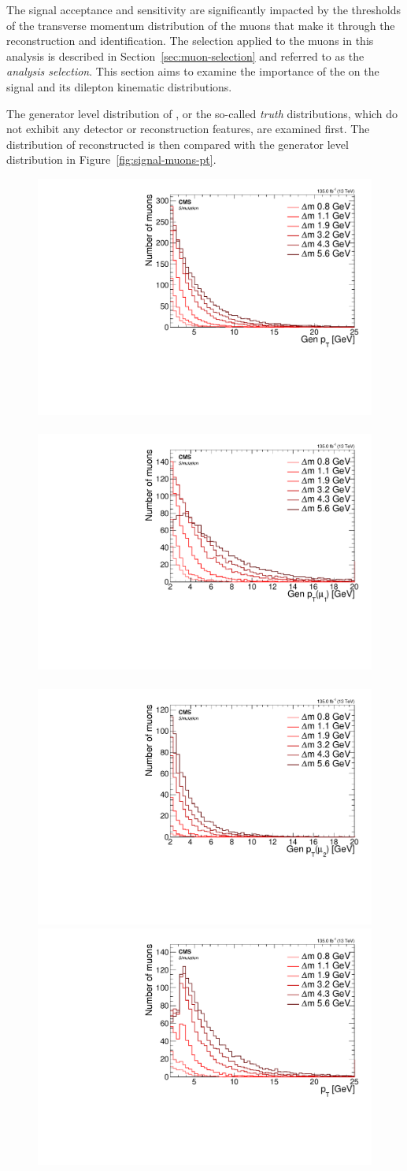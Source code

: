 The signal acceptance and sensitivity are significantly impacted by the thresholds of the transverse momentum \pt distribution of the muons that make it through the reconstruction and identification. The selection applied to the muons in this analysis is described in Section~\ref{sec:muon-selection} and referred to as the \emph{analysis selection}. This section aims to examine the importance of the \pt on the signal and its dilepton kinematic distributions.

The generator level distribution of \pt, or the so-called \emph{truth} distributions, which do not exhibit any detector or reconstruction features, are examined first. The distribution of reconstructed \pt is then compared with the generator level distribution in Figure~\ref{fig:signal-muons-pt}. 

\begin{figure}[!htb]
\centering
\includegraphics[width=0.32\linewidth]{plots/signal_muons_gen/none_Muons_pt.pdf} \,
\includegraphics[width=0.32\linewidth]{plots/signal_muons_gen/none_Muons_m1_pt.pdf}  \,
\includegraphics[width=0.32\linewidth]{plots/signal_muons_gen/none_Muons_m2_pt.pdf} \\
\includegraphics[width=0.32\linewidth]{plots/signal_muons/none_Muons_pt.pdf} \,

\end{figure}
